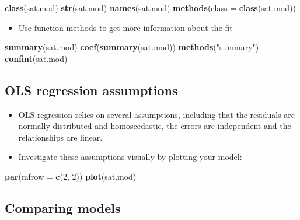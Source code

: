 \documentclass[]{book}
\newenvironment{Shaded}{\begin{snugshade}}{\end{snugshade}}
\newcommand{\KeywordTok}[1]{\textcolor[rgb]{0.13,0.29,0.53}{\textbf{#1}}}
\newcommand{\DataTypeTok}[1]{\textcolor[rgb]{0.13,0.29,0.53}{#1}}
\newcommand{\DecValTok}[1]{\textcolor[rgb]{0.00,0.00,0.81}{#1}}
\newcommand{\StringTok}[1]{\textcolor[rgb]{0.31,0.60,0.02}{#1}}
\newcommand{\NormalTok}[1]{#1}
\providecommand{\tightlist}{%
  \setlength{\itemsep}{0pt}\setlength{\parskip}{0pt}}
\begin{document}
\begin{Shaded}
\begin{Highlighting}[]
  \KeywordTok{class}\NormalTok{(sat.mod)}
  \KeywordTok{str}\NormalTok{(sat.mod)}
  \KeywordTok{names}\NormalTok{(sat.mod)}
  \KeywordTok{methods}\NormalTok{(}\DataTypeTok{class =} \KeywordTok{class}\NormalTok{(sat.mod))}
\end{Highlighting}
\end{Shaded}

\begin{itemize}
\tightlist
\item
  Use function methods to get more information about the fit
\end{itemize}

\begin{Shaded}
\begin{Highlighting}[]
  \KeywordTok{summary}\NormalTok{(sat.mod)}
  \KeywordTok{coef}\NormalTok{(}\KeywordTok{summary}\NormalTok{(sat.mod))}
  \KeywordTok{methods}\NormalTok{(}\StringTok{"summary"}\NormalTok{)}
  \KeywordTok{confint}\NormalTok{(sat.mod)}
\end{Highlighting}
\end{Shaded}

\subsection{OLS regression
assumptions}\label{ols-regression-assumptions}

\begin{itemize}
\tightlist
\item
  OLS regression relies on several assumptions, including that the
  residuals are normally distributed and homoscedastic, the errors are
  independent and the relationships are linear.
\item
  Investigate these assumptions visually by plotting your model:
\end{itemize}

\begin{Shaded}
\begin{Highlighting}[]
  \KeywordTok{par}\NormalTok{(}\DataTypeTok{mfrow =} \KeywordTok{c}\NormalTok{(}\DecValTok{2}\NormalTok{, }\DecValTok{2}\NormalTok{)) }
  \KeywordTok{plot}\NormalTok{(sat.mod)}
\end{Highlighting}
\end{Shaded}

\subsection{Comparing models}\label{comparing-models}
\end{document}
